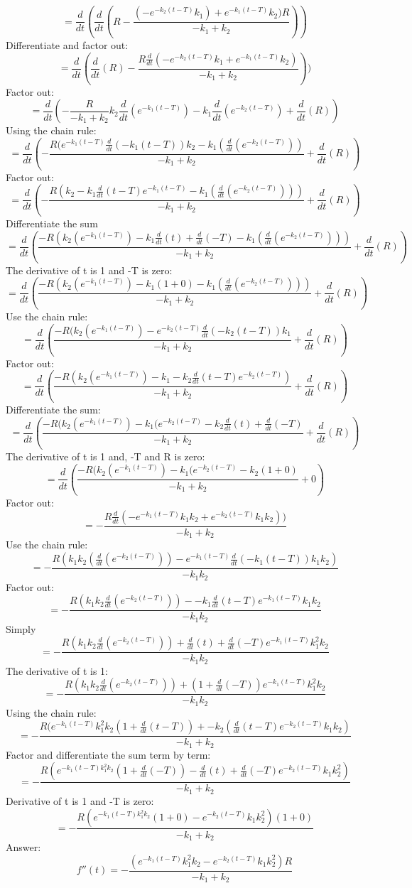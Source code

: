 \documentclass[]{article}
\begin{document}
\[=\frac{d}{dt}(\frac{d}{dt}(R - \frac{(-e^{-k_2(t-T)}k_1) + e^{-k_1(t-T)}k_2)R}{-k_1+k_2}))\]
Differentiate and factor out:
\[=\frac{d}{dt}(\frac{d}{dt}(R) - \frac{R \frac{d}{dt}(-e^{-k_2(t-T)}k_1 + e^{-k_1(t-T)}k_2)}{-k_1+k_2}))\]
Factor out:
\[=\frac{d}{dt}(-\frac{R}{-k_1 + k_2}k_2\frac{d}{dt}(e^{-k_1(t-T)})-k_1\frac{d}{dt}(e^{-k_2(t-T)})+\frac{d}{dt}(R))\]
Using the chain rule:
\[=\frac{d}{dt}(-\frac{R(e^{-k_1(t-T)}\frac{d}{dt}(-k_1(t-T))k_2 - k_1(\frac{d}{dt}(e^{-k_2(t-T)}))}{-k_1 +k_2}+\frac{d}{dt}(R))\]
Factor out:
\[= \frac{d}{dt}(-\frac{R(k_2-k_1 \frac{d}{dt}(t-T)e^{-k_1(t-T)}-k_1( \frac{d}{dt}(e^{-k_2(t-T)})))}{-k_1+k_2} + \frac{d}{dt}(R))\]
Differentiate the sum
\[=\frac{d}{dt}(\frac{-R(k_2(e^{-k_1(t-T)})-k_1\frac{d}{dt}(t)+\frac{d}{dt}(-T)-k_1(\frac{d}{dt}(e^{-k_2(t-T)})))}{-k_1+k_2}+\frac{d}{dt}(R))\]
The derivative of t is 1 and -T is zero:
\[=\frac{d}{dt}(\frac{-R(k_2(e^{-k_1(t-T)})-k_1(1+0)-k_1(\frac{d}{dt}(e^{-k_2(t-T)})))}{-k_1+k_2}+\frac{d}{dt}(R))\]
Use the chain rule:
\[=\frac{d}{dt}(\frac{-R(k_2(e^{-k_1(t-T)})-e^{-k_2(t-T)}\frac{d}{dt}(-k_2(t-T))k_1 }{-k_1+k_2}+\frac{d}{dt}(R))\]
Factor out:
\[=\frac{d}{dt}(\frac{-R(k_2(e^{-k_1(t-T)})-k_1-k_2\frac{d}{dt}(t-T)e^{-k_2(t-T)})  }{-k_1+k_2}+\frac{d}{dt}(R))\]
Differentiate the sum:
\[=\frac{d}{dt}(\frac{-R(k_2(e^{-k_1(t-T)})-k_1(e^{-k_2(t-T)}-k_2\frac{d}{dt}(t)+\frac{d}{dt}(-T)}{-k_1+k_2}+\frac{d}{dt}(R))\]
The derivative of t is 1 and, -T and R is zero:
\[=\frac{d}{dt}(\frac{-R(k_2(e^{-k_1(t-T)})-k_1(e^{-k_2(t-T)}-k_2(1+0)}{-k_1+k_2}+0)\]
Factor out:
\[=-\frac{R\frac{d}{dt}(-e^{-k_1(t-T)}k_1 k_2 + e^{-k_2(t-T)}k_1 k_2))}{-k_1 + k_2}\]
Use the chain rule:
\[=-\frac{R(k_1 k_2(\frac{d}{dt}(e^{-k_2(t-T)}))-e^{-k_1(t-T)}\frac{d}{dt}(-k_1(t-T))k_1 k_2)}{-k_1 k_2}\]
Factor out:
\[=-\frac{R(k_1 k_2 \frac{d}{dt}(e^{-k_2(t-T)}))--k_1\frac{d}{dt}(t-T)e^{-k_1(t-T)}k_1 k_2}{-k_1 k_2}\]
Simply
\[=-\frac{R(k_1 k_2 \frac{d}{dt}(e^{-k_2(t-T)}))+\frac{d}{dt}(t)+\frac{d}{dt}(-T)e^{-k_1(t-T)}k_1^2 k_2}{-k_1 k_2}\]
The derivative of t is 1:
\[=-\frac{R(k_1 k_2 \frac{d}{dt}(e^{-k_2(t-T)}))+(1+\frac{d}{dt}(-T))e^{-k_1(t-T)}k_1^2 k_2}{-k_1 k_2}\]
Using the chain rule:
\[=-\frac{R(e^{-k_1(t-T)}k_1^2k_2(1+\frac{d}{dt}(t-T))+-k_2(\frac{d}{dt}(t-T)e^{-k_2(t-T)}k_1 k_2)}{-k_1 + k_2}\]
Factor and differentiate the sum term by term:
\[=-\frac{R(e^{-k_1(t-T)k_1^2k_2}(1+\frac{d}{dt}(-T))- \frac{d}{dt}(t)+\frac{d}{dt}(-T)e^{-k_2(t-T)}k_1 k_2^2)}{-k_1 + k_2}\]
Derivative of t is 1 and -T is zero:
\[=-\frac{R(e^{-k_1(t-T)k_1^2k_2}(1+0)-e^{-k_2(t-T)}k_1 k_2^2)(1+0)}{-k_1 + k_2}\]
Answer:
\[f''(t) =-\frac{(e^{-k_1 (t-T)}k_1^2 k_2 -e^{-k_2(t-T)}k_1 k_2^2)R}{-k_1 + k_2}\]
\end{document}
